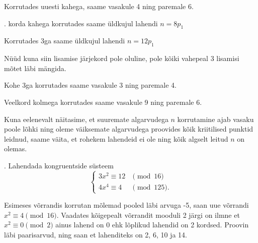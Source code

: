 \documentclass[a4paper, 10pt]{article}
\begin{document}
\quad\quad Korrutades uuesti kahega, saame vasakule 4 ning paremale 6.

\quad \quad {}. korda kahega korrutades saame üldkujul lahendi $n=8p_1$

\quad\quad\quad Korrutades 3ga saame üldkujul lahendi $n=12p_1$

Nüüd kuna siin lisamise järjekord pole oluline, pole kõiki vahepeal 3 lisamisi mõtet läbi mängida.

\quad Kohe 3ga korrutades saame vasakule 3 ning paremale 4.

\quad \quad Veelkord kolmega korrutades saame vasakule 9 ning paremale 6.

Kuna eelenevalt näitasime, et suuremate algarvudega $n$ korrutamine ajab vasaku poole lõhki ning oleme väiksemate algarvudega proovides kõik kriitilised punktid leidnud, saame väita, et rohekem lahendeid ei ole ning kõik algselt leitud $n$ on olemas.
\bigskip
\pagebreak

. Lahendada kongruentside s\"usteem 
\[
\left\{
\begin{array}{ll}
3x^2\equiv 12 & \pmod{16}\\
4x^4\equiv 4 & \pmod{125}.
\end{array}
\right.
\]

\bigskip
Esimeses võrrandis korrutan mõlemad pooled läbi arvuga -5, saan uue võrrandi $x^2\equiv4\pmod{16}$. Vaadates kõigepealt võrrandit mooduli 2 järgi on ilmne et $x^2\equiv0\pmod2$ ainus lahend on 0 ehk lõplikud lahendid on 2 kordsed. Proovin läbi paarisarvud, ning saan et lahenditeks on 2, 6, 10 ja 14.\\
\end{document}

